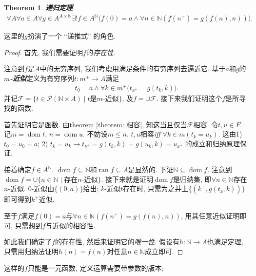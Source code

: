 \documentclass[openany]{ctexbook}
\newcommand*{\indexbf}[1]{\emph{\textbf{#1}}\index{#1}} %
\theoremstyle{plain}
\newtheorem{theorem}{Theorem}[section] %
\theoremstyle{definition}
\DeclareMathOperator{\dom}{dom}
\DeclareMathOperator{\ran}{ran}
\begin{document}
\begin{theorem} \indexbf{递归定理}
\begin{align*}
	\forall A\forall a\in A\forall g \in A^{A\times \mathbb N}\exists ! f\in A^\mathbb N\big(
		f(0)=a \wedge \forall n\in \mathbb N(
			f(n^+) = g(f(n),n))\big).
\end{align*}
\end{theorem}
这里的$g$扮演了一个 ``递推式'' 的角色.
\begin{proof}
首先, 我们需要证明$f$的\emph{存在性}. 

注意到$f$是$A$中的无穷序列, 我们考虑用满足条件的有穷序列去逼近它.
基于$a$和$g$的\indexbf{$m$-近似}定义为有穷序列$t\colon m^+\to A$满足
\begin{align*}
	t_0 = a\wedge \forall k\in m^+\big(
		t_{k^+} = g(t_k,k)\big).
\end{align*}
并记$
\mathcal F = \{ t\in \mathscr P(\mathbb N\times A)\mid t\text{是$m$-近似}\}$, 及$
f = \cup \mathcal F$. 接下来我们证明这个$f$是所寻找的函数.

首先证明它是函数. 
由theorem \ref{theorem: 相容}, 知这当且仅当$\mathcal F$相容. 
令$t,u\in F$. 记$m=\dom t$, $n=\dom u$. 不妨设$m\leq n$.
$t,u$相容\emph{iff} $\forall k\in m (t_k = u_k)$. 
这由1) $t_0=u_0=a$; 2) $t_k =u_k \to t_{k^+} = g( t_k,k) = g(u_k,k) = u_{k^+}$ 的成立和归纳原理保证.

接着确定$f \in A^\mathbb N$. $\dom f \subseteq \mathbb N $和$\ran f \subseteq A$是显然的.
下证$\mathbb N \subseteq \dom f$. 注意到$\dom f = \cup \{ n\in \mathbb N\mid \text{存在$n$-近似}\}$.
接下来就是证明$\dom f$是归纳集, 即$\forall n\in \mathbb N$存在$n$-近似. 
$0$-近似由$\{(0,a)\}$给出; $k$-近似$t$存在时, 只需为之并上$\{(k^+, g(t_k, k))\}$即可得到$k^+$近似.

至于$f$满足$f(0)=a$与$\forall n\in \mathbb N(f(n^+) = g(f(n),n))$, 用其任意近似证明即可, 只需想到$f$与近似的相容性.

如此我们确定了$f$的存在性, 然后来证明它的\emph{唯一性}. 
假设有$h: \mathbb N \to A$也满足定理, 只需用归纳法证明$h(n)=f(n)$对任意$n\in \mathbb N$成立即可. 
\end{proof}

这样的$f$只能是一元函数, 定义运算需要带参数的版本:
\end{document}
